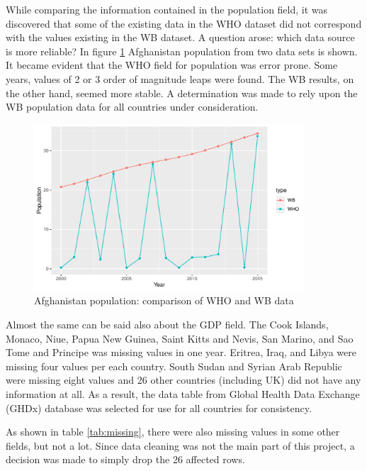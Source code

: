 While comparing the information contained in the population field, it was discovered that some of the existing data in the WHO dataset did not correspond with the values existing in the WB dataset. A question arose: which data source is more reliable? In figure \ref{fig:afghanistan_pop_comparison} Afghanistan population from two data sets is shown. It became evident that the WHO field for population was error prone. Some years, values of 2 or 3 order of magnitude leaps were found. The WB results, on the other hand, seemed more stable. A determination was made to rely upon the WB population data for all countries under consideration.


\begin{figure}
  \centering
  \includegraphics[width = 0.9\textwidth]{figures/Afghanistan_population_comparison}
  \caption{Afghanistan population: comparison of WHO and WB data}
  \label{fig:afghanistan_pop_comparison}
\end{figure}

Almost the same can be said also about the GDP field. The Cook Islands, Monaco, Niue, Papua New Guinea, Saint Kitts and Nevis, San Marino, and Sao Tome and Principe was missing values in one year. Eritrea, Iraq, and Libya were missing four values per each country. South Sudan and Syrian Arab Republic were missing eight values and 26 other countries (including UK) did not have any information at all. As a result, the data table from Global Health Data Exchange (GHDx) database \cite{GHDx} was selected for use for all countries for consistency.

As shown in table \ref{tab:missing}, there were also missing values in some other fields, but not a lot. Since data cleaning was not the main part of this project, a decision was made to simply drop the 26 affected rows.








